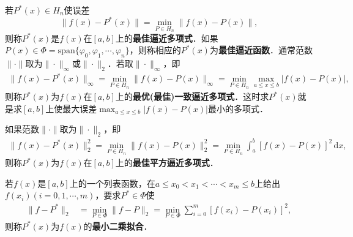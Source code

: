 \documentclass[../../main.tex]{subfiles}
\begin{document}
\begin{definition}
若\( P^*(x) \in H_n \)使误差
\[
\| f(x) - P^* (x) \| = \min_{P \in H_n} \| f(x) - P(x) \|,
\]
则称\( P^*(x) \)是\( f(x) \)在\([a,b]\)上的\textbf{最佳逼近多项式}．如果\( P(x) \in \Phi = \text{span}\{\varphi_0, \varphi_1, \cdots, \varphi_n\} \)，则称相应的\( P^*(x) \)为\textbf{最佳逼近函数}．通常范数\( \|\cdot\| \)取为\( \|\cdot\|_\infty \)或\( \|\cdot\|_2 \)．若取\( \|\cdot\|_\infty \)，即
\begin{align}
\| f(x) - P^* (x) \|_\infty = \min_{P \in H_n} \| f(x) - P(x) \|_\infty = \min_{P \in H_n} \max_{a \leqslant x \leqslant b} | f(x) - P(x) |, \label{eq:数值分析-3-1.18}
\end{align}
则称\( P^*(x) \)为\( f(x) \)在\([a,b]\)上的\textbf{最优(最佳)一致逼近多项式}．这时求\( P^*(x) \)就是求\([a,b]\)上使最大误差\( \max_{a \leqslant x \leqslant b} | f(x) - P(x) | \)最小的多项式．

如果范数\( \|\cdot\| \)取为\( \|\cdot\|_2 \)，即
\begin{align}
\| f(x) - P^* (x) \|_2^2 = \min_{P \in H_n} \| f(x) - P(x) \|_2^2 = \min_{P \in H_n} \int_a^b [f(x) - P(x)]^2 \, \mathrm{d}x, \label{eq:数值分析-3-1.19}
\end{align}
则称\( P^*(x) \)为\( f(x) \)在\([a,b]\)上的\textbf{最佳平方逼近多项式}．

若\( f(x) \)是\([a,b]\)上的一个列表函数，在\( a \leqslant x_0 < x_1 < \cdots < x_m \leqslant b \)上给出\( f(x_i)(i=0,1,\cdots,m) \)，要求\( P^* \in \Phi \)使
\begin{align}
\| f - P^* \|_2 &= \min_{P \in \Phi} \| f - P \|_2 = \min_{P \in \Phi} \sum_{i=0}^m [f(x_i) - P(x_i)]^2, \label{eq:数值分析-3-1.20}
\end{align}
则称\( P^*(x) \)为\( f(x) \)的\textbf{最小二乘拟合}．
\end{definition}
\end{document}
